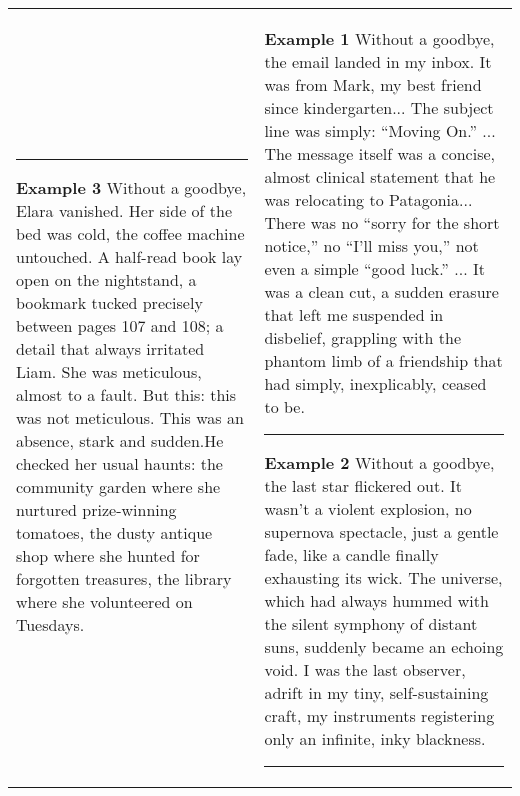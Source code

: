 \begin{table*}[t]
{\begin{tabular}{p{} | p{}}
\vspace{1em}\hrule\vspace{1em}

\textbf{Example 3} \newline
Without a goodbye, Elara vanished. Her side of the bed was cold, the coffee machine untouched. A half-read book lay open on the nightstand, a bookmark tucked precisely between pages 107 and 108; a detail that always irritated Liam. She was meticulous, almost to a fault. But this: this was not meticulous. This was an absence, stark and sudden.He checked her usual haunts: the community garden where she nurtured prize-winning tomatoes, the dusty antique shop where she hunted for forgotten treasures, the library where she volunteered on Tuesdays.
&
\textbf{Example 1} \newline
Without a goodbye, the email landed in my inbox. It was from Mark, my best friend since kindergarten... The subject line was simply: ``Moving On.'' ... The message itself was a concise, almost clinical statement that he was relocating to Patagonia... There was no ``sorry for the short notice,'' no ``I'll miss you,'' not even a simple ``good luck.'' ... It was a clean cut, a sudden erasure that left me suspended in disbelief, grappling with the phantom limb of a friendship that had simply, inexplicably, ceased to be.


\vspace{1em}\hrule\vspace{1em}

\textbf{Example 2} \newline
Without a goodbye, the last star flickered out. It wasn't a violent explosion, no supernova spectacle, just a gentle fade, like a candle finally exhausting its wick. The universe, which had always hummed with the silent symphony of distant suns, suddenly became an echoing void. I was the last observer, adrift in my tiny, self-sustaining craft, my instruments registering only an infinite, inky blackness.

\vspace{1em}\hrule\vspace{1em}


\end{tabular}}
\end{table*}
